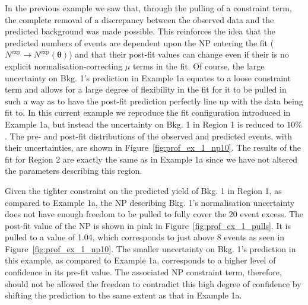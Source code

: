 In the previous example we saw that, through the pulling of a constraint term,
the complete removal of a discrepancy between the observed data and the
predicted background was made possible.
This reinforces the idea that the predicted numbers of events are dependent
upon the NP entering the fit ($N^{\text{exp}} \rightarrow N^{\text{exp}}(\bm{\theta})$)
and that their post-fit values can change even if their is no explicit normalisation-correcting $\mu$ terms in the fit.
Of course, the large uncertainty on Bkg. 1's prediction in Example 1a equates to a loose constraint term and allows for a large degree of
flexibility in the fit for it to be pulled in such a way as to have the post-fit prediction perfectly line up with
the data being fit to.
In this current example we reproduce the fit configuration introduced in Example 1a, but instead the
uncertainty on Bkg. 1 in Region 1 is reduced to $10\%$.
The pre- and post-fit distributions of the observed and predicted events, with their uncertainties,
are shown in Figure~\ref{fig:prof_ex_1_np10}.
The results of the fit for Region 2 are exactly the same as in Example 1a since we have not altered
the parameters describing this region.

Given the tighter constraint on the predicted yield of Bkg. 1 in Region 1, as compared to Example 1a,
the NP describing Bkg. 1's normalisation uncertainty does not have enough freedom to be pulled to fully
cover the 20 event excess.
The post-fit value of the NP is shown in pink in Figure~\ref{fig:prof_ex_1_pulls}.
It is pulled to a value of 1.04, which corresponds to just above 8 events as seen in Figure~\ref{fig:prof_ex_1_np10}.
The smaller uncertainty on Bkg. 1's prediction in this example, as compared to Example 1a, corresponds
to a higher level of confidence in its pre-fit value.
The associated NP constraint term, therefore, should not be allowed the freedom to contradict this
high degree of confidence by shifting the prediction to the same extent as that in Example 1a.

